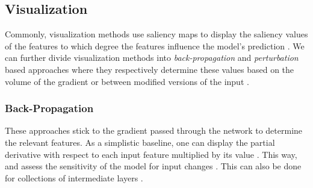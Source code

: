 \subsection{Visualization}
Commonly, visualization methods use saliency maps to display the saliency values of the features \ie to which degree the features influence the model's prediction \citep{xie2020explainable}. We can further divide visualization methods into \emph{back-propagation} and \emph{perturbation} based approaches where they respectively determine these values based on the volume of the gradient or between modified versions of the input \citep{xie2020explainable}. 

\subsubsection{Back-Propagation}
\label{sec:CAMs}
These approaches stick to the gradient passed through the network to determine the relevant features. As a simplistic baseline, one can display the partial derivative with respect to each input feature multiplied by its value \citep{xie2020explainable}. This way,  \citet{SimonyanVZ13} and \citet{SpringenbergDBR14} assess the sensitivity of the model for input changes \citep{xie2020explainable}. This can also be done for collections of intermediate layers \citep{ShrikumarGK17, MontavonLBSM17, Bach2015, ZeilerF14}.

